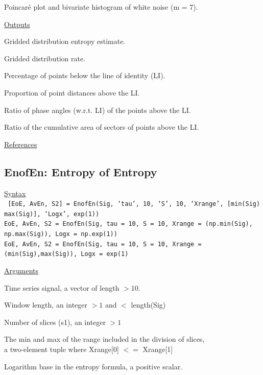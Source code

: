 \documentclass[12pt, a4paper, titlepage, openany]{book}
\begin{document}
\begin{description}[labelsep=1cm, labelwidth=2cm, nosep, style=multiline,leftmargin=3cm]
{					Poincaré plot and bivariate histogram of white noise (m = 7).}
\end{description}

\noindent \ul{Outputs}
\begin{description}[labelsep=1cm, labelwidth=2cm, nosep, style=multiline,leftmargin=3cm]\footnotesize
\item[\texttt{GDE}]	Gridded distribution entropy estimate.
\item[\texttt{GDR}]	Gridded distribution rate.
\item[\texttt{PIx}]	Percentage of points below the line of identity (LI). \cite{Grid3}
\item[\texttt{GIx}]	Proportion of point distances above the LI. \cite{Grid5}
\item[\texttt{SIx}]	Ratio of phase angles (w.r.t. LI) of the points above the LI.\cite{Grid4} 
\item[\texttt{AIx}]	Ratio of the cumulative area of sectors of points above the LI.\cite{Grid2}
\end{description}

\noindent \ul{References}\hspace{1cm}
\cite{Grid1} \cite{Grid2} \cite{Grid3} \cite{Grid4} \cite{Grid5}



\newpage
\subsection{\normalsize EnofEn: \hspace{15mm} Entropy of Entropy}
\noindent\ul{Syntax} \vspace{6mm} \\ \noindent \texttt{\footnotesize
[EoE, AvEn, S2]  = EnofEn(Sig, ‘tau’, 10, ‘S’, 10, ‘Xrange’, [min(Sig) max(Sig)], ‘Logx’, exp(1)) \\
EoE, AvEn, S2 = EnofEn(Sig, tau = 10, S = 10, Xrange = (np.min(Sig), np.max(Sig)), Logx = np.exp(1)) \\
EoE, AvEn, S2 = EnofEn(Sig, tau = 10, S = 10, Xrange = (min(Sig),max(Sig)), Logx = exp(1)}

\noindent \ul{Arguments}
\begin{description}[labelsep=1cm, labelwidth=2cm, nosep, style=multiline,leftmargin=3cm]\footnotesize
\item[\texttt{Sig}]		Time series signal, a vector of length $> 10$.
\item[\texttt{tau}]		Window length, an integer $> 1$ and $<$ length(Sig)
\item[\texttt{S}]		Number of slices (s1), an integer $> 1$
\item[\texttt{Xrange}]	The min and max of the range included in the division of slices, \\
						a two-element tuple where Xrange[0] $<=$ Xrange[1]
\item[\texttt{Logx}]	Logarithm base in the entropy formula, a positive scalar.
\end{description}
\end{document}
